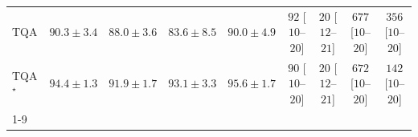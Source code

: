 \begin{tabular}{l|cccc|cccc|}
TQA & {\cellcolor[HTML]{046198}} \color[HTML]{F1F1F1} $90.3\pm 3.4$ & {\cellcolor[HTML]{056AA6}} \color[HTML]{F1F1F1} $88.0\pm 3.6$ & {\cellcolor[HTML]{1C7FB8}} \color[HTML]{F1F1F1} $83.6\pm 8.5$ & {\cellcolor[HTML]{04629A}} \color[HTML]{F1F1F1} $90.0\pm 4.9$ & {\cellcolor[HTML]{FDE3E0}} \color[HTML]{000000} $92$ [$10$--$20$] & {\cellcolor[HTML]{FFF4F0}} \color[HTML]{000000} $20$ [$12$--$21$] & {\cellcolor[HTML]{7C0177}} \color[HTML]{F1F1F1} $677$ [$10$--$20$] & {\cellcolor[HTML]{F87EA9}} \color[HTML]{F1F1F1} $356$ [$10$--$20$] \\
TQA$^\star$ & {\cellcolor[HTML]{034C78}} \color[HTML]{F1F1F1} $94.4\pm 1.3$ & {\cellcolor[HTML]{045B8E}} \color[HTML]{F1F1F1} $91.9\pm 1.7$ & {\cellcolor[HTML]{045585}} \color[HTML]{F1F1F1} $93.1\pm 3.3$ & {\cellcolor[HTML]{03466E}} \color[HTML]{F1F1F1} $95.6\pm 1.7$ & {\cellcolor[HTML]{FDE4E0}} \color[HTML]{000000} $90$ [$10$--$20$] & {\cellcolor[HTML]{FFF4F0}} \color[HTML]{000000} $20$ [$12$--$21$] & {\cellcolor[HTML]{7F0178}} \color[HTML]{F1F1F1} $672$ [$10$--$20$] & {\cellcolor[HTML]{FDD6D2}} \color[HTML]{000000} $142$ [$10$--$20$] \\
\cline{1-9}
\bottomrule
\end{tabular}
